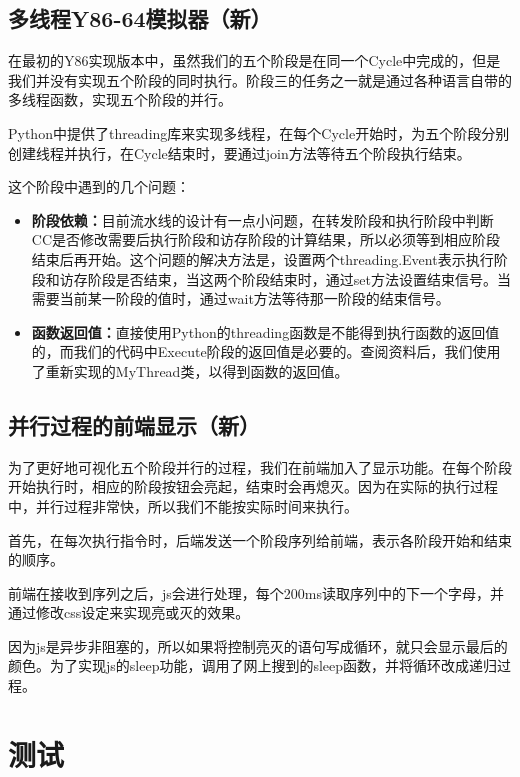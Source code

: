 \documentclass[12pt]{article} %
\begin{document}
\begin{sloppypar}
\subsection{多线程Y86-64模拟器（新）}

在最初的Y86实现版本中，虽然我们的五个阶段是在同一个Cycle中完成的，但是我们并没有实现五个阶段的同时执行。阶段三的任务之一就是通过各种语言自带的多线程函数，实现五个阶段的并行。

Python中提供了threading库来实现多线程，在每个Cycle开始时，为五个阶段分别创建线程并执行，在Cycle结束时，要通过join方法等待五个阶段执行结束。

这个阶段中遇到的几个问题：

\begin{itemize}
\item {\bf 阶段依赖：}目前流水线的设计有一点小问题，在转发阶段和执行阶段中判断CC是否修改需要后执行阶段和访存阶段的计算结果，所以必须等到相应阶段结束后再开始。这个问题的解决方法是，设置两个threading.Event表示执行阶段和访存阶段是否结束，当这两个阶段结束时，通过set方法设置结束信号。当需要当前某一阶段的值时，通过wait方法等待那一阶段的结束信号。
\item {\bf 函数返回值：}直接使用Python的threading函数是不能得到执行函数的返回值的，而我们的代码中Execute阶段的返回值是必要的。查阅资料后，我们使用了重新实现的MyThread类，以得到函数的返回值。
\end{itemize}

\subsection{并行过程的前端显示（新）}

为了更好地可视化五个阶段并行的过程，我们在前端加入了显示功能。在每个阶段开始执行时，相应的阶段按钮会亮起，结束时会再熄灭。因为在实际的执行过程中，并行过程非常快，所以我们不能按实际时间来执行。

首先，在每次执行指令时，后端发送一个阶段序列给前端，表示各阶段开始和结束的顺序。

前端在接收到序列之后，js会进行处理，每个200ms读取序列中的下一个字母，并通过修改css设定来实现亮或灭的效果。

因为js是异步非阻塞的，所以如果将控制亮灭的语句写成循环，就只会显示最后的颜色。为了实现js的sleep功能，调用了网上搜到的sleep函数，并将循环改成递归过程。

\clearpage
\section{测试}


\end{sloppypar}
\end{document}
